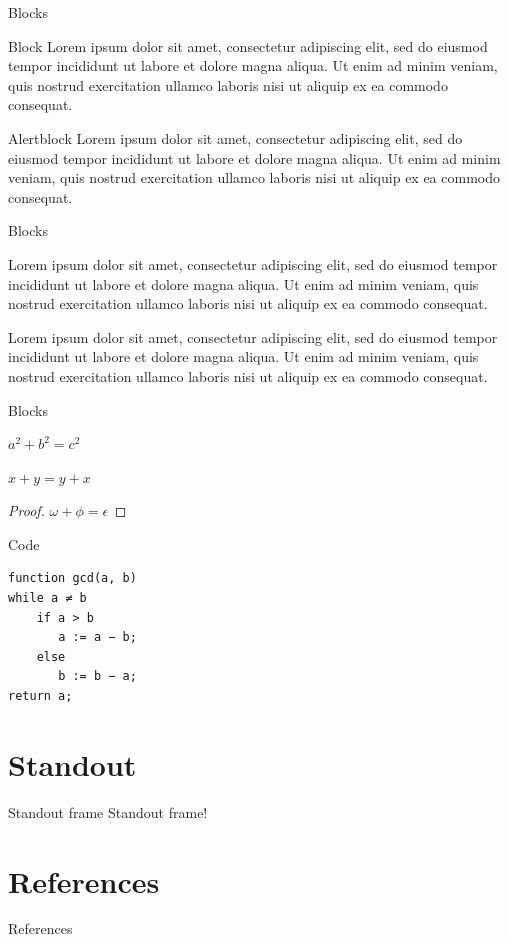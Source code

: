 \documentclass[aspectratio=169]{beamer}
\newcommand{\lorem}{Lorem ipsum dolor sit amet, consectetur adipiscing elit, sed do eiusmod tempor incididunt ut labore et dolore magna aliqua. Ut enim ad minim veniam, quis nostrud exercitation ullamco laboris nisi ut aliquip ex ea commodo consequat.}
\begin{document}
\begin{frame}{Blocks \Romannum{\theblocks}}
    \begin{block}{Block}
        \lorem
    \end{block}
    \begin{alertblock}{Alertblock}
        \lorem
    \end{alertblock}
\end{frame}

\begin{frame}{Blocks \Romannum{\theblocks}}
    \begin{definition}
        \lorem
    \end{definition}
    \begin{example}
        \lorem
    \end{example}
\end{frame}

\begin{frame}{Blocks \Romannum{\theblocks}}
    \begin{theorem}[Pythagoras] 
        $ a^2 + b^2 = c^2$
    \end{theorem}
    \begin{corollary}
        $ x + y = y + x  $
    \end{corollary}
    \begin{proof}
        $\omega +\phi = \epsilon$
    \end{proof}
\end{frame}

\begin{frame}[fragile]{Code}
    \begin{lstlisting}[frame=single, caption=Euclidean algorithm, captionpos=b]
function gcd(a, b)
while a ≠ b 
    if a > b
       a := a − b; 
    else
       b := b − a; 
return a;
    \end{lstlisting}
\end{frame}

\section{Standout}

\begin{frame}[standout]{Standout frame}
Standout frame!
\end{frame}


\section{References}

\begin{frame}{References}
   \nocite{*}
   \printbibliography
\end{frame}
\finalframe
\end{document}
